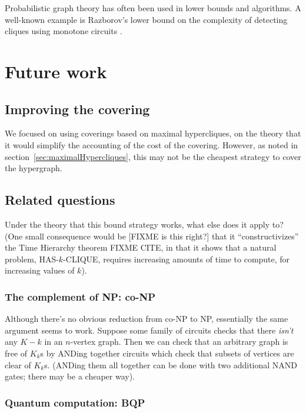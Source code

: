 \documentclass[12pt]{article}
\theoremstyle{definition}
\begin{document}
Probabilistic graph theory has often been used in
lower bounds and algorithms. A well-known example is Razborov's lower
bound on the complexity of detecting cliques using monotone circuits
\cite{Razborov85lowerbounds}.


\section{Future work}

\subsection{Improving the covering}

We focused on using coverings based on maximal hypercliques, on
the theory that it would simplify the accounting of the cost of
the covering.
However, as noted in section~\ref{sec:maximalHypercliques}, this
may not be the cheapest strategy to cover the hypergraph.

\subsection{Related questions}

Under the theory that this bound strategy works, what else does
it apply to? (One small consequence would be
[FIXME is this right?] that it ``constructivizes''
the Time Hierarchy theorem FIXME CITE, in that it shows that
a natural problem, HAS-$k$-CLIQUE, requires increasing amounts of
time to compute, for increasing values of $k$).

\subsubsection{The complement of NP: co-NP}

Although there's no obvious reduction from co-NP to NP, essentially
the same argument seems to work. Suppose some family of circuits
checks that there {\em isn't} any $K-k$ in an $n$-vertex graph.
Then we can check that an arbitrary graph is free of $K_k$s by
ANDing together circuits which check that subsets of vertices are
clear of $K_k$s. (ANDing them all together can be done with
two additional NAND gates; there may be a cheaper way).

\subsubsection{Quantum computation: BQP}
\end{document}
